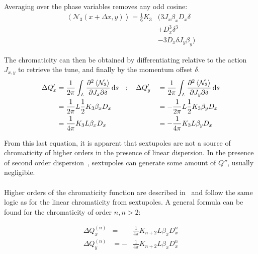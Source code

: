 Averaging over the phase variables removes any odd cosine:
\begin{equation}\begin{aligned}
  \left< \mathcal{N}_3(x + \Delta x, y) \right> = \frac{1}{6} K_3 &\biggl(
       3 J_x \beta_x D_x \delta \\
  &    + D_x^3 \delta^3 \\
  &    - 3 D_x \delta J_y \beta_y \biggl)
\end{aligned}\end{equation}


The chromaticity can then be obtained by differentiating relative to the action $J_{x,y}$ to
retrieve the tune, and finally by the momentum offset $\delta$.
\begin{equation}
    \begin{aligned}
        \Delta Q'_x &= \frac{1}{2\pi} \int_L \frac{\partial^2 \left< \mathcal{N}_3 \right>}{\partial J_x \partial \delta} \mathop{}\!\mathrm{d} s \quad; \quad \Delta Q'_y &&= \frac{1}{2\pi} \int_L \frac{\partial^2 \left< \mathcal{N}_3 \right>}{\partial J_y \partial \delta} \mathop{}\!\mathrm{d} s \\
        &= \frac{1}{2 \pi} L \frac{1}{2} K_3 \beta_x D_x  &&= - \frac{1}{2 \pi} L \frac{1}{2} K_3 \beta_y D_x \\
        &= \frac{1}{4 \pi}  K_3 L \beta_x D_x &&= - \frac{1}{4 \pi}  K_3 L \beta_y D_x
    \end{aligned}
\end{equation}

From this last equation, it is apparent that sextupoles are not a source of chromaticity of higher
orders in the presence of linear dispersion. In the presence of second order
dispersion~\cite{keintzel_second-order_2019}, sextupoles can generate some amount of $Q''$, usually
negligible.


\paragraph{}

Higher orders of the chromaticity function are described in~\cite{dilly_derivation_2023} and follow
the same logic as for the linear chromaticity from sextupoles.
A general formula can be found for the chromaticity of order $n, n > 2$:

\begin{equation}
    \begin{aligned}
        \Delta Q_x^{(n)} &= &\frac{1}{4\pi} K_{n+2} L \beta_x D_x^{n}\\
        \Delta Q_y^{(n)} &= -&\frac{1}{4\pi} K_{n+2} L \beta_x D_x^{n}\\
    \end{aligned}
    \label{eq:detuning_effects:chromaticity_strength}
\end{equation}




